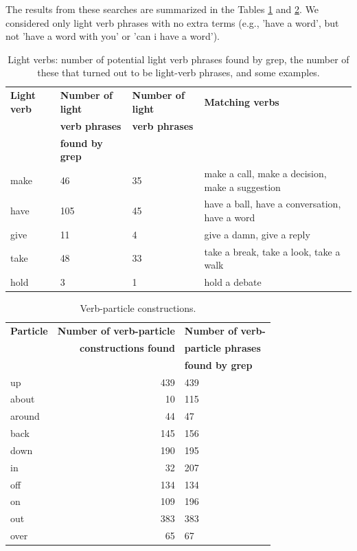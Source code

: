 \documentclass[11pt]{article}
\begin{document}
The results from these searches are summarized in the Tables \ref{light-verbs} and \ref{verb-particle}. We considered only light verb phrases with no extra terms (e.g., 'have a word', but not 'have a word with you' or 'can i have a word').

\begin{center}
\begin{table}
\hfill{}
\begin{tabular}{|l|l|l|l|}
\hline \bf Light verb & \bf Number of light & \bf Number of light & \bf Matching verbs\\ 
 & \bf verb phrases & \bf verb phrases & \\ 
 & \bf  found by grep & & \\ \hline
make & 46 & 35 & make a call, make a decision, make a suggestion\\
have & 105 & 45 & have a ball, have a conversation, have a word\\
give & 11 & 4 & give a damn, give a reply\\
take & 48 & 33 & take a break, take a look, take a walk\\
hold & 3 & 1 & hold a debate\\
\hline
\end{tabular}
\hfill{}
\caption{Light verbs: number of potential light verb phrases found by grep, the number of these that turned out to be light-verb phrases, and some examples. }
\label{light-verbs}
\end{table}
\end{center}

\begin{table}[h]
\begin{center}
\begin{tabular}{|l|r|l|}
\hline \bf Particle & \bf Number of verb-particle  & \bf Number of verb-\\ 
 & \bf constructions found & \bf  particle phrases \\ 
& & \bf found by grep \\ \hline
up & 439 & 439 \\
about & 10 & 115 \\
around & 44 & 47 \\
back & 145 & 156 \\
down & 190 & 195 \\
in & 32 & 207 \\
off & 134 & 134 \\
on & 109 & 196 \\
out & 383 & 383 \\
over & 65 & 67 \\
\hline
\end{tabular}
\end{center}
\caption{\label{verb-particle} Verb-particle constructions. }
\end{table}
\end{document}
